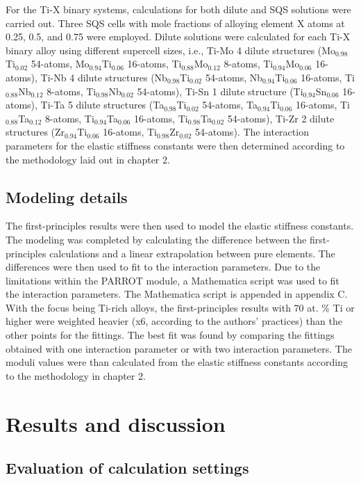 For the Ti-X binary systems, calculations for both dilute and SQS solutions were carried out. Three SQS cells with mole fractions of alloying element X atoms at 0.25, 0.5, and 0.75 were employed. Dilute solutions were calculated for each Ti-X binary alloy using different supercell sizes, i.e., Ti-Mo 4 dilute structures (Mo$_{0.98}$Ti$_{0.02}$ 54-atoms, Mo$_{0.94}$Ti$_{0.06}$ 16-atoms, Ti$_{0.88}$Mo$_{0.12}$ 8-atoms, Ti$_{0.94}$Mo$_{0.06}$ 16-atoms), Ti-Nb 4 dilute structures (Nb$_{0.98}$Ti$_{0.02}$ 54-atoms, Nb$_{0.94}$Ti$_{0.06}$ 16-atoms, Ti$_{0.88}$Nb$_{0.12}$ 8-atoms, Ti$_{0.98}$Nb$_{0.02}$ 54-atoms), Ti-Sn 1 dilute structure (Ti$_{0.94}$Sn$_{0.06}$ 16-atoms), Ti-Ta 5 dilute structures (Ta$_{0.98}$Ti$_{0.02}$ 54-atoms, Ta$_{0.94}$Ti$_{0.06}$ 16-atoms, Ti$_{0.88}$Ta$_{0.12}$ 8-atoms, Ti$_{0.94}$Ta$_{0.06}$ 16-atoms, Ti$_{0.98}$Ta$_{0.02}$ 54-atoms), Ti-Zr 2 dilute structures (Zr$_{0.94}$Ti$_{0.06}$ 16-atoms, Ti$_{0.98}$Zr$_{0.02}$ 54-atoms). The interaction parameters for the  elastic stiffness constants were then determined according to the methodology laid out in chapter 2.

\subsection{Modeling details}

The first-principles results were then used to model the elastic stiffness constants. The modeling was completed by calculating the difference between the first-principles calculations and a linear extrapolation between pure elements. The differences were then used to fit to the interaction parameters. Due to the limitations within the PARROT module, a Mathematica script was used to fit the interaction parameters. The Mathematica script is appended in appendix C. With the focus being Ti-rich alloys, the first-principles results with 70 at. \% Ti or higher were weighted heavier (x6, according to the authors' practices) than the other points for the fittings. The best fit was found by comparing the fittings obtained with one interaction parameter or with two interaction parameters. The moduli values were than calculated from the elastic stiffness constants according to the methodology in chapter 2.

\section{Results and discussion}

\subsection{Evaluation of calculation settings}

